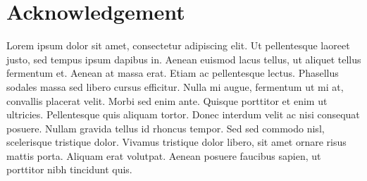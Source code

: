 
\cleardoublepage
{}
{}%
\hypertarget{acknowledgement}{%
\chapter*{Acknowledgement}\label{acknowledgement}}
Lorem ipsum dolor sit amet, consectetur adipiscing elit. Ut pellentesque laoreet justo, sed tempus ipsum dapibus in. Aenean euismod lacus tellus, ut aliquet tellus fermentum et. Aenean at massa erat. Etiam ac pellentesque lectus. Phasellus sodales massa sed libero cursus efficitur. Nulla mi augue, fermentum ut mi at, convallis placerat velit. Morbi sed enim ante. Quisque porttitor et enim ut ultricies. Pellentesque quis aliquam tortor. Donec interdum velit ac nisi consequat posuere. Nullam gravida tellus id rhoncus tempor. Sed sed commodo nisl, scelerisque tristique dolor. Vivamus tristique dolor libero, sit amet ornare risus mattis porta. Aliquam erat volutpat. Aenean posuere faucibus sapien, ut porttitor nibh tincidunt quis.

\cleardoublepage
